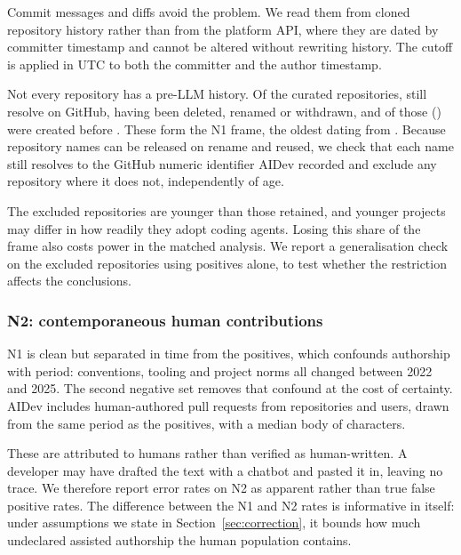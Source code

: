 Commit messages and diffs avoid the problem. We read them from cloned repository history
rather than from the platform API, where they are dated by committer timestamp and
cannot be altered without rewriting history. The cutoff is applied in UTC to both the
committer and the author timestamp.

Not every repository has a pre-LLM history. Of the \RepoFrame{} curated repositories,
\NOneResolved{} still resolve on GitHub, \NOneUnresolvable{} having been deleted,
renamed or withdrawn, and \NOneEligible{} of those (\NOneEligiblePct{}) were created
before \LlmCutoff{}. These form the N1 frame, the oldest dating from \NOneOldestRepo{}.
Because repository names can be released on rename and reused, we check that each name
still resolves to the GitHub numeric identifier AIDev recorded and exclude any
repository where it does not, independently of age.

The \NOneExcluded{} excluded repositories are younger than those retained, and younger
projects may differ in how readily they adopt coding agents. Losing this share of the
frame also costs power in the matched analysis. We report a generalisation check on the
excluded repositories using positives alone, to test whether the restriction affects the
conclusions.

\subsubsection{N2: contemporaneous human contributions}
\label{sec:groundtruth:n2}

N1 is clean but separated in time from the positives, which confounds authorship with
period: conventions, tooling and project norms all changed between 2022 and 2025. The
second negative set removes that confound at the cost of certainty. AIDev includes
\AidevHumanPRs{} human-authored pull requests from \AidevHumanRepos{} repositories and
\AidevHumanUsers{} users, drawn from the same period as the positives, with a median
body of \AidevHumanBodyMedian{} characters.

These are attributed to humans rather than verified as human-written. A developer may
have drafted the text with a chatbot and pasted it in, leaving no trace. We therefore
report error rates on N2 as apparent rather than true false positive rates. The
difference between the N1 and N2 rates is informative in itself: under assumptions we
state in Section~\ref{sec:correction}, it bounds how much undeclared assisted authorship
the human population contains.

